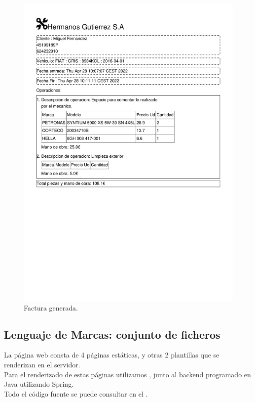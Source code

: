 \documentclass{article}
\begin{document}
  \begin{figure}[H]
    \centering
    \includegraphics[width=1.0\textwidth]{program/capturasEjec/Factura 6.pdf}
    \caption{Factura generada.}
  \end{figure}

\subsection{Lenguaje de Marcas: conjunto de ficheros}
La página web consta de 4 páginas estáticas, y otras 2 plantillas que se renderizan en el servidor.\\
Para el renderizado de estas páginas utilizamos \href{https://www.thymeleaf.org/}{\color{red}{Thymeleaf}}, junto al backend programado en Java utilizando Spring.\\
Todo el código fuente se puede consultar en el \href{https://github.com/martinfgar/WebTaller}{\color{red}{repositorio del proyecto}}.
\end{document}

